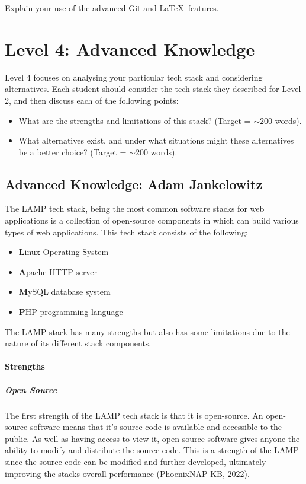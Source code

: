 \documentclass[a4paper, 11pt]{report}
\begin{document}
	Explain your use of the advanced Git and \LaTeX\ features. 
	
	
	
	
	\newpage
	\section{Level 4: Advanced Knowledge}
	
	Level 4 focuses on analysing your particular tech stack and considering alternatives. Each student should consider the tech stack they described for Level 2, and then discuss each of the following points:
	\begin{itemize}
		\item What are the strengths and limitations of this stack? (Target = $\sim$200 words).
		\item What alternatives exist, and under what situations might these alternatives be a better choice? (Target = $\sim$200 words).
	\end{itemize}
	\subsection{Advanced Knowledge: Adam Jankelowitz}
	The LAMP tech stack, being the most common software stacks for web applications is a collection of open-source components in which can build various types of web applications. This tech stack consists of the following;
	\begin{itemize}
	    \item \textbf{L}inux Operating System
	    \item \textbf{A}pache HTTP server
	    \item \textbf{M}ySQL database system
	    \item \textbf{P}HP programming language
	\end{itemize}
	
	\noindent
    The LAMP stack has many strengths but also has some limitations due to the nature of its different stack components.
    
	\paragraph{Strengths}
	
	\subparagraph{Open Source}
	\noindent
	The first strength of the LAMP tech stack is that it is open-source. An open-source software means that it's source code is available and accessible to the public. As well as having access to view it, open source software gives anyone the ability to modify and distribute the source code. This is a strength of the LAMP since the source code can be modified and further developed, ultimately improving the stacks overall performance (PhoenixNAP KB, 2022).
	
\end{document}
